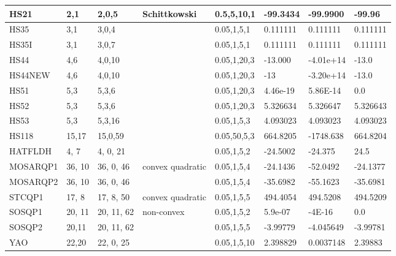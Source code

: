 \begin{landscape}
\begin{longtable}{l | l |  l  |  >{\footnotesize}p{3cm} | l | l | l | l  }
HS21    &  2,1 & 2,0,5   & Schittkowski  &  0.5,5,10,1   & -99.3434  & -99.9900  & -99.96    \\ \hline 
HS35   &  3,1  & 3,0,4  &             &  0.05,1,5,1    & 0.111111  & 0.111111   &   0.111111   \\ \hline 
HS35I   &  3,1  & 3,0,7  &             &   0.05,1,5,1      & 0.111111  & 0.111111   &   0.111111   \\ \hline 
HS44   & 4,6   & 4,0,10   &  	 & 0.05,1,20,3      &  -13.000 & -4.01e+14 & -13.0    \\ \hline
HS44NEW & 4,6  & 4,0,10  &     &   0.05,1,20,3    & -13     & -3.20e+14   & -13.0    \\ \hline
HS51    &  5,3   & 5,3,6    &  & 0.05,1,20,3      & 4.46e-19   & 5.86E-14     & 0.0    \\ \hline
HS52    &  5,3  & 5,3,6   & & 0.05,1,20,3      & 5.326634   & 5.326647   & 5.326643   \\ \hline
HS53    &  5,3  & 5,3,16    &   &  0.05,1,5,3  & 4.093023   & 4.093023   & 4.093023  \\ \hline
HS118  & 15,17  & 15,0,59  & & 0.05,50,5,3   & 664.8205  & -1748.638  &664.8204    \\ \hline
HATFLDH  & 4, 7 &  4, 0, 21  & & 0.05,1,5,2  &  -24.5002  & -24.375 & 24.5   \\ \hline

MOSARQP1 & 36, 10 & 36, 0, 46 &convex quadratic & 0.05,1,5,4 &  -24.1436 & -52.0492 & -24.1377 \\ \hline
MOSARQP2 &36, 10 & 36, 0, 46 &  &0.05,1,5,4  & -35.6982  &-55.1623  & -35.6981 \\ \hline
STCQP1  & 17, 8  &  17, 8, 50 & convex quadratic  & 0.05,1,5,5& 494.4054  & 494.5208  & 494.5209 \\\hline
SOSQP1 &  20, 11 & 20, 11, 62 & non-convex  &  0.05,1,5,2 &5.9e-07 & -4E-16   & 0.0 \\\hline
SOSQP2 & 20,11  &  20, 11, 62 &  &0.05,1,5,5	&  -3.99779  & -4.045649  & -3.99781    \\\hline
YAO   &  22,20  & 22, 0, 25 & & 0.05,1,5,10& 2.398829  & 0.0037148 & 2.39883  \\\hline
\end{longtable}   %
\end{landscape}


